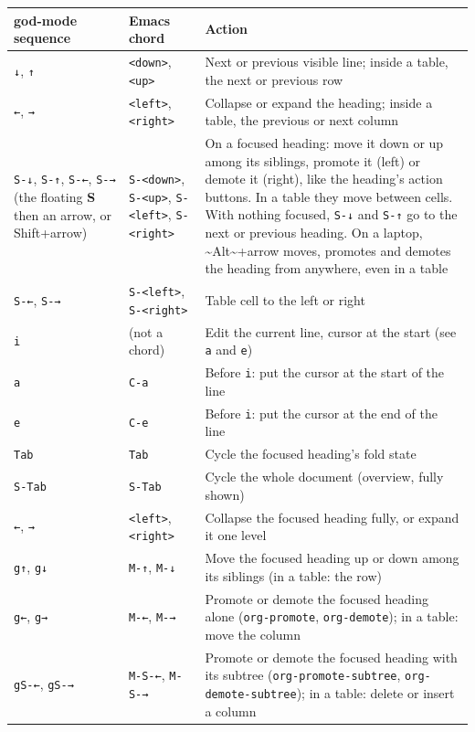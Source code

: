 \documentclass[11pt]{article}
\begin{document}
\begin{center}
\begin{tabular}{lll}
god-mode sequence & Emacs chord & Action\\[0pt]
\hline
\texttt{↓}, \texttt{↑} & \texttt{<down>}, \texttt{<up>} & Next or previous visible line; inside a table, the next or previous row\\[0pt]
\texttt{←}, \texttt{→} & \texttt{<left>}, \texttt{<right>} & Collapse or expand the heading; inside a table, the previous or next column\\[0pt]
\texttt{S-↓}, \texttt{S-↑}, \texttt{S-←}, \texttt{S-→} (the floating \textbf{S} then an arrow, or Shift+arrow) & \texttt{S-<down>}, \texttt{S-<up>}, \texttt{S-<left>}, \texttt{S-<right>} & On a focused heading: move it down or up among its siblings, promote it (left) or demote it (right), like the heading's action buttons. In a table they move between cells. With nothing focused, \texttt{S-↓} and \texttt{S-↑} go to the next or previous heading. On a laptop, \textasciitilde{}Alt\textasciitilde{}+arrow moves, promotes and demotes the heading from anywhere, even in a table\\[0pt]
\texttt{S-←}, \texttt{S-→} & \texttt{S-<left>}, \texttt{S-<right>} & Table cell to the left or right\\[0pt]
\texttt{i} & (not a chord) & Edit the current line, cursor at the start (see \texttt{a} and \texttt{e})\\[0pt]
\texttt{a} & \texttt{C-a} & Before \texttt{i}: put the cursor at the start of the line\\[0pt]
\texttt{e} & \texttt{C-e} & Before \texttt{i}: put the cursor at the end of the line\\[0pt]
\texttt{Tab} & \texttt{Tab} & Cycle the focused heading's fold state\\[0pt]
\texttt{S-Tab} & \texttt{S-Tab} & Cycle the whole document (overview, fully shown)\\[0pt]
\texttt{←}, \texttt{→} & \texttt{<left>}, \texttt{<right>} & Collapse the focused heading fully, or expand it one level\\[0pt]
\texttt{g↑}, \texttt{g↓} & \texttt{M-↑}, \texttt{M-↓} & Move the focused heading up or down among its siblings (in a table: the row)\\[0pt]
\texttt{g←}, \texttt{g→} & \texttt{M-←}, \texttt{M-→} & Promote or demote the focused heading alone (\texttt{org-promote}, \texttt{org-demote}); in a table: move the column\\[0pt]
\texttt{gS-←}, \texttt{gS-→} & \texttt{M-S-←}, \texttt{M-S-→} & Promote or demote the focused heading with its subtree (\texttt{org-promote-subtree}, \texttt{org-demote-subtree}); in a table: delete or insert a column\\[0pt]

\end{tabular}
\end{center}
\end{document}
